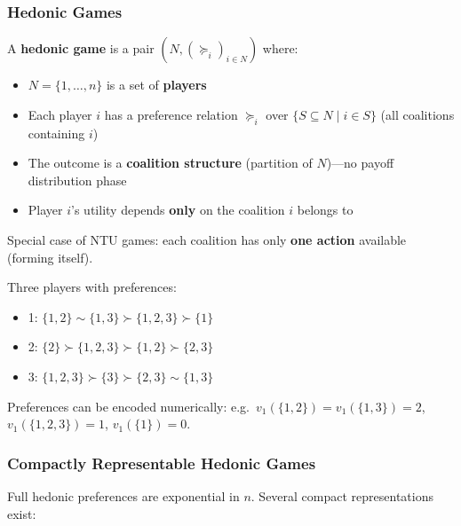 \separator

\subsubsection{Hedonic Games}

\begin{defbox}
A \textbf{hedonic game} is a pair $(N, (\succeq_i)_{i \in N})$ where:
\begin{itemize}
  \item $N = \{1, \ldots, n\}$ is a set of \textbf{players}
  \item Each player $i$ has a preference relation $\succeq_i$ over $\{S \subseteq N \mid i \in S\}$ (all coalitions containing $i$)
  \item The outcome is a \textbf{coalition structure} (partition of $N$)---no payoff distribution phase
  \item Player $i$'s utility depends \textbf{only} on the coalition $i$ belongs to
\end{itemize}

Special case of NTU games: each coalition has only \textbf{one action} available (forming itself).
\end{defbox}

\begin{exbox}
Three players with preferences:
\begin{itemize}
  \item 1: $\{1, 2\} \sim \{1, 3\} \succ \{1, 2, 3\} \succ \{1\}$
  \item 2: $\{2\} \succ \{1, 2, 3\} \succ \{1, 2\} \succ \{2, 3\}$
  \item 3: $\{1, 2, 3\} \succ \{3\} \succ \{2, 3\} \sim \{1, 3\}$
\end{itemize}

Preferences can be encoded numerically: e.g.\ $v_1(\{1,2\}) = v_1(\{1,3\}) = 2$, $v_1(\{1,2,3\}) = 1$, $v_1(\{1\}) = 0$.
\end{exbox}

\separator

\subsubsection{Compactly Representable Hedonic Games}

Full hedonic preferences are exponential in $n$. Several compact representations exist:

